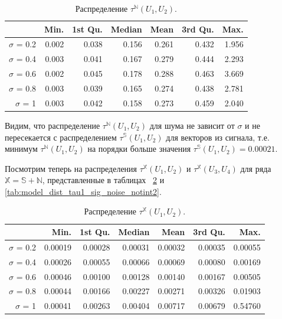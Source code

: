 \documentclass[specialist,
               substylefile = spbu.rtx,
               subf,href,colorlinks=true, 12pt]{disser}
\begin{document}
\begin{table}[hhh!]
\caption{Распределение $\tau^{\mathbb{N}}(U_1, U_2)$.}
\centering
\begin{tabular}{rrrrrrr}
  \hline
 & Min. & 1st Qu. & Median & Mean & 3rd Qu. & Max. \\
  \hline
$\sigma$ = 0.2 & 0.002 & 0.038 & 0.156 & 0.261 & 0.432 & 1.956 \\ 
  $\sigma$ = 0.4 & 0.003 & 0.041 & 0.167 & 0.279 & 0.444 & 2.293 \\ 
  $\sigma$ = 0.6 & 0.002 & 0.045 & 0.178 & 0.288 & 0.463 & 3.669 \\ 
  $\sigma$ = 0.8 & 0.003 & 0.039 & 0.165 & 0.274 & 0.438 & 2.781 \\ 
  $\sigma$ = 1 & 0.003 & 0.042 & 0.158 & 0.273 & 0.459 & 2.040 \\ 
   \hline
\end{tabular}
\label{tab:model_dist_tau1_sig_notint}
\end{table}


Видим, что распределение $\tau^{\mathbb{N}}(U_1, U_2)$ для шума не зависит от $\sigma$ и не пересекается с распределением $\tau^{\mathbb{S}}(U_1, U_2)$ для векторов из сигнала, т.е. минимум $\tau^{\mathbb{N}}(U_1, U_2)$ на порядки больше значения $\tau^{\mathbb{S}}(U_1, U_2) = 0.00021$.

Посмотрим теперь на распределения  $\tau^{\mathbb{X}}(U_1, U_2)$ и  $\tau^{\mathbb{X}}(U_3, U_4)$ для ряда $\mathbb{X} = \mathbb{S} + \mathbb{N}$, представленные в таблицах ~\ref{tab:model_dist_tau1_sig_noise_notint} и \ref{tab:model_dist_tau1_sig_noise_notint2}.

\begin{table}[hhh!]
\caption{Распределение $\tau^{\mathbb{X}}(U_1, U_2)$.}
\centering
\begin{tabular}{rrrrrrr}
  \hline
 & Min. & 1st Qu. & Median & Mean & 3rd Qu. & Max. \\
  \hline
$\sigma$ = 0.2 & 0.00019 & 0.00028 & 0.00031 & 0.00032 & 0.00035 & 0.00055 \\ 
  $\sigma$ = 0.4 & 0.00026 & 0.00055 & 0.00066 & 0.00069 & 0.00080 & 0.00169 \\ 
  $\sigma$ = 0.6 & 0.00046 & 0.00100 & 0.00128 & 0.00140 & 0.00167 & 0.00505 \\ 
  $\sigma$ = 0.8 & 0.00044 & 0.00166 & 0.00227 & 0.00271 & 0.00326 & 0.01903 \\ 
  $\sigma$ = 1 & 0.00041 & 0.00263 & 0.00404 & 0.00717 & 0.00679 & 0.54760 \\ 
   \hline
\end{tabular}
\label{tab:model_dist_tau1_sig_noise_notint}
\end{table}
\end{document}
